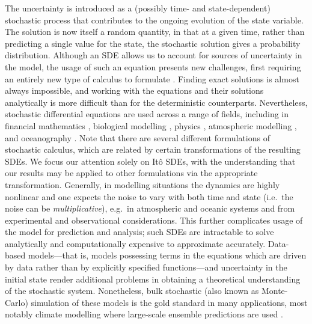 The uncertainty is introduced as a (possibly time- and state-dependent) stochastic process that contributes to the ongoing evolution of the state variable.
The solution is now itself a random quantity, in that at a given time, rather than predicting a single value for the state, the stochastic solution gives a probability distribution.
Although an SDE allows us to account for sources of uncertainty in the model, the usage of such an equation presents new challenges, first requiring an entirely new type of calculus to formulate \citep{Ito_1944_StochasticIntegral,Ito_1946_StochasticIntegralEquation}.
Finding exact solutions is almost always impossible, and working with the equations and their solutions analytically is more difficult than for the deterministic counterparts.
Nevertheless, stochastic differential equations are used across a range of fields, including in financial mathematics \citehere, biological modelling \citep[e.g.]{PreislerEtAl_2004_ModelingAnimalMovements,another}, physics \citep[e.g.]{StraussEffenberger_2017_HitchhikerGuideStochastic,GardinerEtAl_1992_WavefunctionQuantumStochastic,another}, atmospheric modelling \citehere, and oceanography \citep{BerloffMcWilliams_2002_MaterialTransportOceanic}.
Note that there are several different formulations of stochastic calculus, which are related by certain transformations of the resulting SDEs.
We focus our attention solely on It\^o SDEs, with the understanding that our results may be applied to other formulations via the appropriate transformation.
Generally, in modelling situations the dynamics are highly nonlinear and one expects the noise to vary with both time and state (i.e.\ the noise can be \emph{multiplicative}), e.g.\ in atmospheric \citep{SuraEtAl_2005_MultiplicativeNoiseNonGaussianity,Sura_2003_StochasticAnalysisSouthern} and oceanic \citep{KamenkovichEtAl_2015_PropertiesOriginsAnisotropic} systems and from experimental and observational considerations.
This further complicates usage of the model for prediction and analysis; such SDEs are intractable to solve analytically and computationally expensive to approximate accurately.
Data-based models---that is, models possessing terms in the equations which are driven by data rather than by explicitly specified functions---and uncertainty in the initial state render additional problems in obtaining a theoretical understanding of the stochastic system.
Nonetheless, bulk stochastic (also known as Monte-Carlo) simulation of these models is the gold standard in many applications, most notably climate modelling where large-scale ensemble predictions are used \citep{Collins_2007_EnsemblesProbabilitiesNew,LeutbecherEtAl_2017_StochasticRepresentationsModel}.

